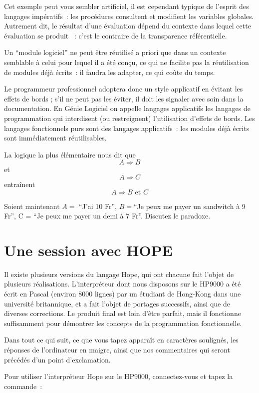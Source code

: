 Cet exemple peut vous sembler artificiel, il est cependant typique de
 l'esprit des langages impératifs~: les procédures consultent et
 modifient les variables globales. Autrement dit, le résultat d'une
 évaluation dépend du contexte dans lequel cette évaluation se produit
~: c'est le contraire de la transparence référentielle.

Un ``module logiciel'' ne peut être réutilisé a priori que dans un
contexte semblable à celui pour lequel il a été con\c{c}u, ce qui ne
facilite pas la réutilisation de modules déjà écrits~: il faudra les
adapter, ce qui co\^ute du temps.

Le programmeur professionnel adoptera donc un style applicatif en
évitant les effets de bords ; s'il ne peut pas les éviter, il doit les
signaler avec soin dans la documentation. En Génie Logiciel on appelle
langages applicatifs les langages de programmation qui interdisent (ou
restreignent) l'utilisation d'effets de bords. Les langages
fonctionnels purs sont des langages applicatifs~: les modules déjà
écrits sont immédiatement réutilisables.

\begin{exercice} La logique la plus élémentaire nous dit que 
$$A \Rightarrow B$$ et $$A \Rightarrow C$$ entraînent 
 $$ A \Rightarrow B \mbox{ et } C$$ 

Soient maintenant $ A =$ ``J'ai 10 Fr'', 
$B =$``Je peux me payer un sandwitch à 9 Fr'', 
C = ``Je peux me payer un demi à 7 Fr''. Discutez le paradoxe.
\end{exercice}

\section{Une session avec HOPE}

Il existe plusieurs versions du langage Hope, qui ont chacune fait
l'objet de plusieurs réalisations. L'interpréteur dont nous disposons
sur le HP9000 a été écrit en Pascal (environ 8000 lignes) par un
étudiant de Hong-Kong dans une université britannique, et a fait
l'objet de portages successifs, ainsi que de diverses corrections. Le
produit final est loin d'être parfait, mais il fonctionne
suffisamment pour démontrer les concepts de la programmation
fonctionnelle.

Dans tout ce qui suit, ce que vous tapez apparaît en caractères
soulignés, les réponses de l'ordinateur en maigre, ainsi que nos
commentaires qui seront précédés d'un point d'exclamation.

Pour utiliser l'interpréteur Hope sur le HP9000, connectez-vous et
tapez la commande~:


